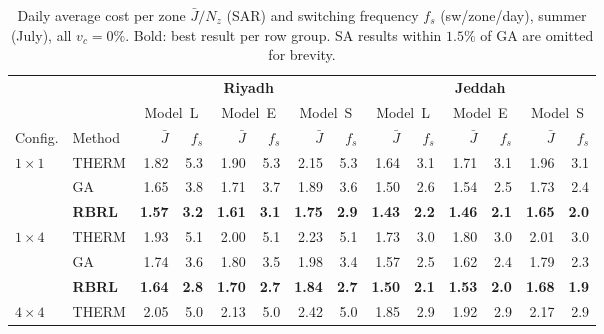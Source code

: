 \documentclass[3p,number]{elsarticle}
\renewcommand{\arraystretch}{0.90}
\newcommand{\Jbar}{\bar{J}}
\begin{document}
\begin{table}[!t]
\centering
\caption{Daily average cost per zone $\Jbar/N_z$ (SAR) and switching
frequency $f_s$ (sw/zone/day), summer (July), all $v_c=0\%$.
Bold: best result per row group. SA results within $1.5\%$ of GA are omitted for brevity.}
\label{tab:model_comp}
\setlength{\tabcolsep}{2.4pt}
\renewcommand{\arraystretch}{0.92}
\begin{tabularx}{\linewidth}{@{}lXrrrrrrrrrrrr@{}}
\toprule
& & \multicolumn{6}{c}{\textbf{Riyadh}} &
    \multicolumn{6}{c}{\textbf{Jeddah}} \\
\cmidrule(lr){3-8}\cmidrule(lr){9-14}
& & \multicolumn{2}{c}{Model~L} &
    \multicolumn{2}{c}{Model~E} &
    \multicolumn{2}{c}{Model~S} &
    \multicolumn{2}{c}{Model~L} &
    \multicolumn{2}{c}{Model~E} &
    \multicolumn{2}{c}{Model~S} \\
\cmidrule(lr){3-4}\cmidrule(lr){5-6}\cmidrule(lr){7-8}
\cmidrule(lr){9-10}\cmidrule(lr){11-12}\cmidrule(lr){13-14}
Config. & Method
  & $\Jbar$ & $f_s$
  & $\Jbar$ & $f_s$
  & $\Jbar$ & $f_s$
  & $\Jbar$ & $f_s$
  & $\Jbar$ & $f_s$
  & $\Jbar$ & $f_s$ \\
\midrule
\multirow{3}{*}{$1\times1$}
  & THERM & 1.82 & 5.3 & 1.90 & 5.3 & 2.15 & 5.3
          & 1.64 & 3.1 & 1.71 & 3.1 & 1.96 & 3.1 \\
  & GA    & 1.65 & 3.8 & 1.71 & 3.7 & 1.89 & 3.6
          & 1.50 & 2.6 & 1.54 & 2.5 & 1.73 & 2.4 \\
  & \textbf{RBRL}
          & \textbf{1.57} & \textbf{3.2}
          & \textbf{1.61} & \textbf{3.1}
          & \textbf{1.75} & \textbf{2.9}
          & \textbf{1.43} & \textbf{2.2}
          & \textbf{1.46} & \textbf{2.1}
          & \textbf{1.65} & \textbf{2.0} \\
\midrule
\multirow{3}{*}{$1\times4$}
  & THERM & 1.93 & 5.1 & 2.00 & 5.1 & 2.23 & 5.1
          & 1.73 & 3.0 & 1.80 & 3.0 & 2.01 & 3.0 \\
  & GA    & 1.74 & 3.6 & 1.80 & 3.5 & 1.98 & 3.4
          & 1.57 & 2.5 & 1.62 & 2.4 & 1.79 & 2.3 \\
  & \textbf{RBRL}
          & \textbf{1.64} & \textbf{2.8}
          & \textbf{1.70} & \textbf{2.7}
          & \textbf{1.84} & \textbf{2.7}
          & \textbf{1.50} & \textbf{2.1}
          & \textbf{1.53} & \textbf{2.0}
          & \textbf{1.68} & \textbf{1.9} \\
\midrule
\multirow{3}{*}{$4\times4$}
  & THERM & 2.05 & 5.0 & 2.13 & 5.0 & 2.42 & 5.0
          & 1.85 & 2.9 & 1.92 & 2.9 & 2.17 & 2.9 \\

\end{tabularx}
\end{table}
\end{document}
